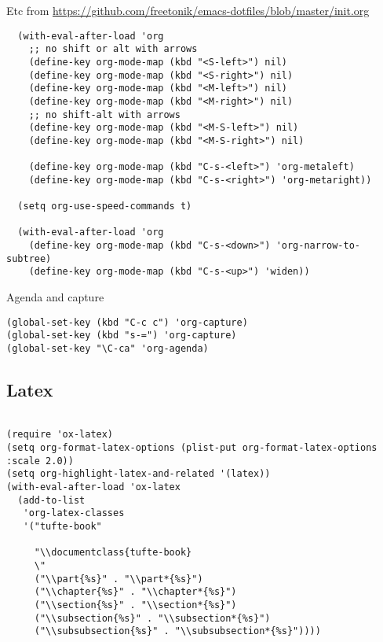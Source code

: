 \documentclass[11pt]{article}
\begin{document}
Etc from \url{https://github.com/freetonik/emacs-dotfiles/blob/master/init.org}

\begin{verbatim}
  (with-eval-after-load 'org
    ;; no shift or alt with arrows
    (define-key org-mode-map (kbd "<S-left>") nil)
    (define-key org-mode-map (kbd "<S-right>") nil)
    (define-key org-mode-map (kbd "<M-left>") nil)
    (define-key org-mode-map (kbd "<M-right>") nil)
    ;; no shift-alt with arrows
    (define-key org-mode-map (kbd "<M-S-left>") nil)
    (define-key org-mode-map (kbd "<M-S-right>") nil)

    (define-key org-mode-map (kbd "C-s-<left>") 'org-metaleft)
    (define-key org-mode-map (kbd "C-s-<right>") 'org-metaright))

  (setq org-use-speed-commands t)

  (with-eval-after-load 'org
    (define-key org-mode-map (kbd "C-s-<down>") 'org-narrow-to-subtree)
    (define-key org-mode-map (kbd "C-s-<up>") 'widen))
\end{verbatim}

Agenda and capture
\begin{verbatim}
(global-set-key (kbd "C-c c") 'org-capture)
(global-set-key (kbd "s-=") 'org-capture)
(global-set-key "\C-ca" 'org-agenda)
\end{verbatim}
\subsection{Latex}
\label{sec:orgdf6c3c3}
\begin{verbatim}

(require 'ox-latex)
(setq org-format-latex-options (plist-put org-format-latex-options :scale 2.0))
(setq org-highlight-latex-and-related '(latex))
(with-eval-after-load 'ox-latex
  (add-to-list
   'org-latex-classes
   '("tufte-book"

     "\\documentclass{tufte-book}
     \"
     ("\\part{%s}" . "\\part*{%s}")
     ("\\chapter{%s}" . "\\chapter*{%s}")
     ("\\section{%s}" . "\\section*{%s}")
     ("\\subsection{%s}" . "\\subsection*{%s}")
     ("\\subsubsection{%s}" . "\\subsubsection*{%s}"))))

\end{verbatim}
\end{document}
